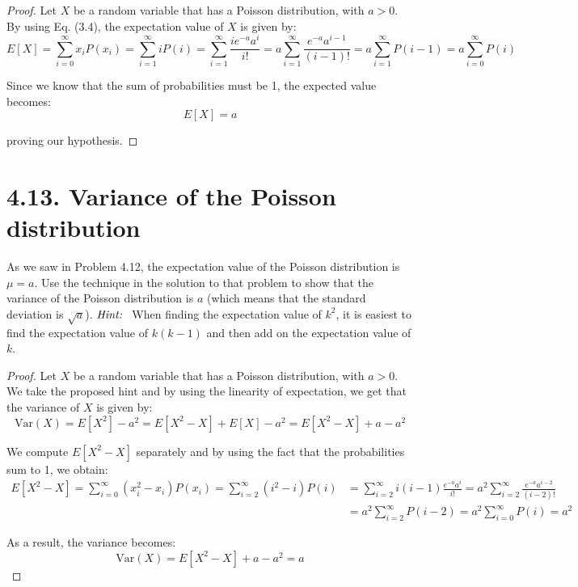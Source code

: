 \vspace{1em}

\begin{proof}
    Let $X$ be a random variable that has a Poisson distribution, with $a > 0$.
    By using Eq. (3.4), the expectation value of $X$ is given by:
    \[
        E[X] = \sum_{i = 0}^\infty x_i P(x_i) = \sum_{i = 1}^\infty  i P(i) 
        = \sum_{i = 1}^\infty  \frac{i e^{-a} a^i}{i!}
        = a \sum_{i = 1}^\infty  \frac{e^{-a} a^{i - 1}}{(i - 1)!}
        = a \sum_{i = 1}^\infty  P(i - 1) = a \sum_{i = 0}^\infty P(i)
    \] 

    Since we know that the sum of probabilities must be 1, the expected value becomes:
    \[
        E[X] = a
    \] 
 
    proving our hypothesis.
\end{proof}

\section*{4.13. Variance of the Poisson distribution}
As we saw in Problem 4.12, the expectation value of the Poisson distribution
is $\mu = a$. Use the technique in the solution to that problem to show that
the variance of the Poisson distribution is $a$ (which means that the standard
deviation is $\sqrt{a}$). $\emph{Hint: }$ When finding the expectation value of
$k^2$, it is easiest to find the expectation value of $k(k -1)$ and then
add on the expectation value of $k$.

\vspace{1em}

\begin{proof}
    Let $X$ be a random variable that has a Poisson distribution, with $a > 0$. We take the proposed 
    hint and by using the linearity of expectation, we get that the variance of $X$ is given by:
    \[
        \text{Var}(X) = E[X^2] - a^2 = E[X^2 - X] + E[X] - a^2 = E[X^2 - X] + a - a^2
    \] 

    We compute $E[X^2 - X]$ separately and by using the fact that the probabilities sum
    to 1, we obtain:
    \begin{align*}
        E[X^2 - X] = \sum_{i = 0}^\infty (x_i^2 - x_i) P(x_i) = \sum_{i = 2}^\infty  (i^2 - i) P(i) 
        &= \sum_{i = 2}^\infty  i(i - 1) \frac{e^{-a}a^i}{i!}
        = a^2\sum_{i = 2}^\infty  \frac{e^{-a}a^{i - 2}}{(i - 2)!} \\
        &= a^2\sum_{i = 2}^\infty  P(i - 2) = a^2 \sum_{i = 0}^\infty P(i) = a^2
    \end{align*}

    As a result, the variance becomes:
    \[
        \text{Var}(X) = E[X^2 - X] + a - a^2 = a
    \] 
\end{proof}

